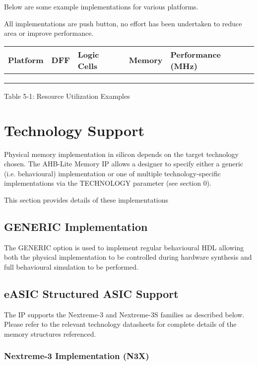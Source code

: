 Below are some example implementations for various platforms.

All implementations are push button, no effort has been undertaken to
reduce area or improve performance.

\begin{longtable}[]{@{}lllll@{}}
\toprule
Platform & DFF & Logic Cells & Memory & Performance (MHz)\tabularnewline
\midrule
\endhead
& & & &\tabularnewline
& & & &\tabularnewline
& & & &\tabularnewline
\bottomrule
\end{longtable}

Table 5‑1: Resource Utilization Examples

\section{Technology Support}\label{technology-support}

Physical memory implementation in silicon depends on the target
technology chosen. The AHB-Lite Memory IP allows a designer to specify
either a generic (i.e. behavioural) implementation or one of multiple
technology-specific implementations via the TECHNOLOGY parameter (see
section 0).

This section provides details of these implementations

\subsection{GENERIC Implementation}\label{generic-implementation}

The GENERIC option is used to implement regular behavioural HDL allowing
both the physical implementation to be controlled during hardware
synthesis and full behavioural simulation to be performed.

\subsection{eASIC Structured ASIC
Support}\label{easic-structured-asic-support}

The IP supports the Nextreme-3 and Nextreme-3S families as described
below. Please refer to the relevant technology datasheets for complete
details of the memory structures referenced.

\subsubsection{Nextreme-3 Implementation
(N3X)}\label{nextreme-3-implementation-n3x}

